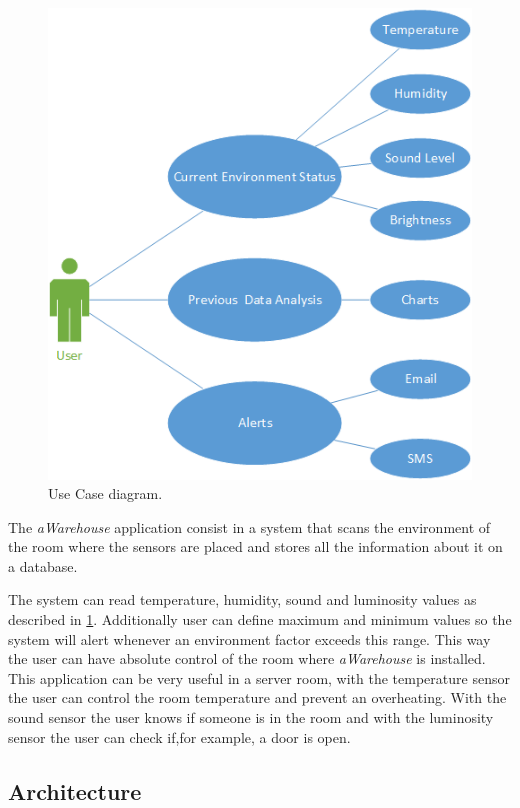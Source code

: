 \documentclass[12pt]{report}
\begin{document}
\begin{figure}
    \centering
    \includegraphics[scale=0.5]{use.png}
    \caption{Use Case diagram.}
    \label{fig:use}
\end{figure}

The \textit{aWarehouse} application consist in a system that scans the environment of the room where the sensors are placed and stores all the information about it on a database.

The system can read temperature, humidity, sound and luminosity values as described in \ref{fig:use}. Additionally user can define maximum and minimum values so the system will alert whenever an environment factor exceeds this range.
This way the user can have absolute control of the room where \textit{aWarehouse} is installed. This application can be very useful in a server room, with the temperature sensor the user can control the room temperature and prevent an overheating. With the sound sensor the user knows if someone is in the room and with the luminosity sensor the user can check if,for example, a door is open.



\subsection{Architecture}
\end{document}
